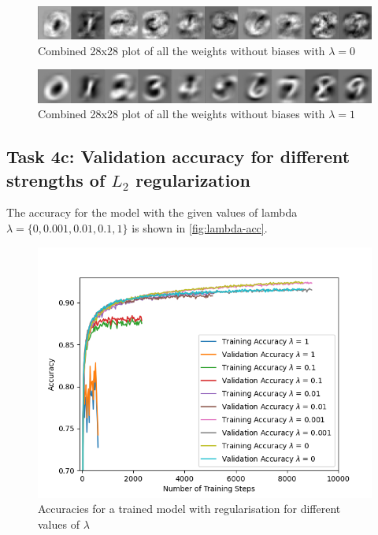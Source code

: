 \documentclass{article}
\begin{document}
 \begin{figure}[H]
     \centering
     \includegraphics[width=\textwidth]{Assignment_1/Assignments/plots/task4/task4b_softmax_weight_0l_.png}
     \caption{Combined 28x28 plot of all the weights without biases with $\lambda = 0$}
     \label{fig:weight_noisy}
 \end{figure}
 
  \begin{figure}[H]
     \centering
     \includegraphics[width=\textwidth]{Assignment_1/Assignments/plots/task4/task4b_softmax_weight_1l_.png}
     \caption{Combined 28x28 plot of all the weights without biases with $\lambda = 1$}
     \label{fig:weight_clean}
 \end{figure}
 
\subsection{Task 4c: Validation accuracy for different strengths of $L_2$ regularization }
The accuracy for the model with the given values of lambda $\lambda= \{0, 0.001, 0.01, 0.1, 1\}$ is shown in \autoref{fig:lambda-acc}.

\begin{figure}[H]
    \centering
    \includegraphics[width=\textwidth]{Assignment_1/Assignments/plots/task4/task4c_l2_reg_accuracy.png}
    \caption{Accuracies for a trained model with regularisation for different values of $\lambda$}
    \label{fig:lambda-acc}
\end{figure}
\end{document}
